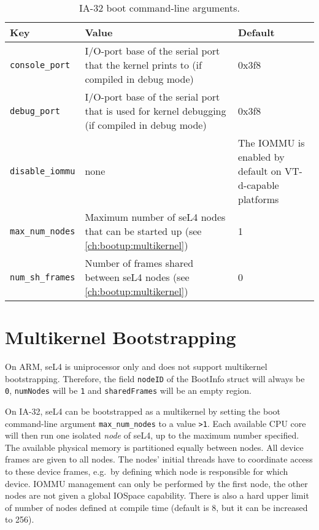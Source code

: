 \begin{table}[htb]
    \caption{IA-32 boot command-line arguments.}
        \begin{tabularx}{\textwidth}{lXX}
            \toprule
              Key & Value & Default \\
            \midrule
            \texttt{console\_port} &
            I/O-port base of the serial port that the kernel prints to
            (if compiled in debug mode) &
            0x3f8 \\
            \texttt{debug\_port} &
            I/O-port base of the serial port that is used for kernel debugging
            (if compiled in debug mode) &
            0x3f8 \\
            \texttt{disable\_iommu} &
            none &
            The IOMMU is enabled by default on VT-d-capable platforms \\
            \texttt{max\_num\_nodes} &
            Maximum number of seL4 nodes that can be started up (see \autoref{ch:bootup:multikernel}) &
            1 \\
            \texttt{num\_sh\_frames} &
            Number of frames shared between seL4 nodes (see \autoref{ch:bootup:multikernel}) &
            0 \\
            \bottomrule
        \end{tabularx}
    \label{tab:bootargs}
\end{table}
\fi

\section{\label{ch:bootup:multikernel}Multikernel Bootstrapping}

On ARM, seL4 is uniprocessor only and does not support multikernel
\cite{Baumann_BDHIPRSS_09} bootstrapping. Therefore, the field \texttt{nodeID}
of the BootInfo struct
will always be \texttt{0}, \texttt{numNodes} will be \texttt{1} and
\texttt{sharedFrames} will be an empty region.

\ifxeightsix
On IA-32, seL4 can be bootstrapped as a multikernel
by setting the boot command-line argument \texttt{max\_num\_nodes} to a value
\texttt{>1}.
Each available CPU core will then run one isolated \emph{node} of seL4, up to
the maximum number specified.
The available physical memory is partitioned equally between nodes.
All device frames are given to all nodes. The nodes' initial threads have to
coordinate access to these device frames, e.g.\ by defining which node is
responsible for which device.
IOMMU management can only be performed by the first node, the other nodes
are not given a global IOSpace capability. 
There is also a hard upper limit of number of nodes defined at compile time
(default is 8, but it can be increased to 256).

